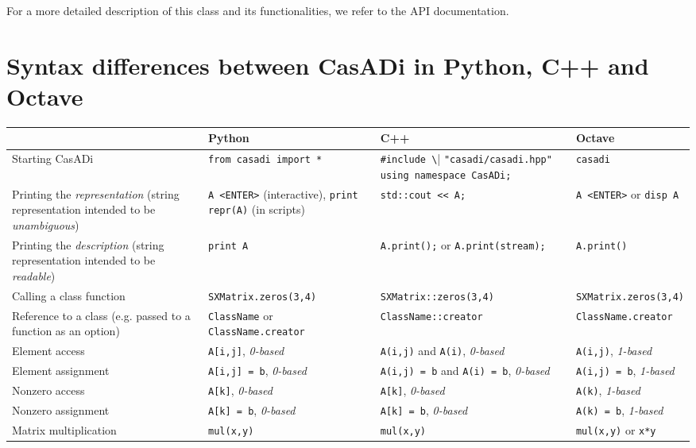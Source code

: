 \documentclass[a4paper,12pt]{book}
\begin{document}
{For a more detailed description of this class and its functionalities, we refer to the API documentation.

\chapter{Syntax differences between CasADi in Python, C++ and Octave}\label{sec:syntax_differences}
\scriptsize
\begin{center}
  \begin{tabular}{| p{3.5cm} | p{3.5cm} | p{3.5cm} | p{3.5cm} | }
    \hline
      & Python & C++ & Octave \\ \hline
    Starting CasADi & \verb|from casadi import *| & \verb|#include \| \verb|"casadi/casadi.hpp"| \verb|using namespace CasADi;| & \verb|casadi| \\ \hline
    Printing the \emph{representation} (string representation intended to be \emph{unambiguous}) & \verb|A <ENTER>| (interactive), \verb|print repr(A)| (in scripts) & \verb|std::cout << A;|& \verb|A <ENTER>| or \verb|disp A|\\ \hline
    Printing the \emph{description} (string representation intended to be \emph{readable}) & \verb|print A| & \verb|A.print();| or \verb|A.print(stream);|& \verb|A.print()| \\ \hline
    Calling a class function & \verb|SXMatrix.zeros(3,4)| & \verb|SXMatrix::zeros(3,4)| & \verb|SXMatrix.zeros(3,4)|\\ \hline
    Reference to a class (e.g. passed to a function as an option) & \verb|ClassName| or \verb|ClassName.creator| & \verb|ClassName::creator| & \verb|ClassName.creator|\\ \hline
    Element access & \verb|A[i,j]|, \emph{0-based} & \verb|A(i,j)| and \verb|A(i)|, \emph{0-based} & \verb|A(i,j)|, \emph{1-based} \\ \hline
    Element assignment & \verb|A[i,j] = b|, \emph{0-based} & \verb|A(i,j) = b| and \verb|A(i) = b|, \linebreak \emph{0-based} & \verb|A(i,j) = b|, \emph{1-based} \\ \hline
    Nonzero access & \verb|A[k]|, \emph{0-based} & \verb|A[k]|, \emph{0-based} & \verb|A(k)|, \emph{1-based} \\ \hline
    Nonzero assignment & \verb|A[k] = b|, \emph{0-based} & \verb|A[k] = b|, \emph{0-based} & \verb|A(k) = b|, \emph{1-based} \\ \hline
    Matrix multiplication & \verb|mul(x,y)| & \verb|mul(x,y)| & \verb|mul(x,y)| or \verb|x*y| \\ \hline

\end{tabular}
\end{center}}
\end{document}
